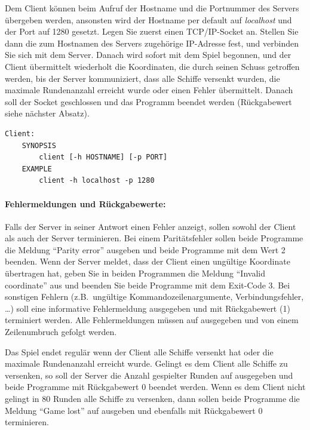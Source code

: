 Dem Client können beim Aufruf der Hostname und die Portnummer des Servers
übergeben werden, ansonsten wird der Hostname per default auf \emph{localhost}
und der Port auf 1280 gesetzt. Legen Sie zuerst einen
TCP/IP-Socket an. Stellen Sie dann die zum Hostnamen des Servers zugehörige
IP-Adresse fest, und verbinden Sie sich mit dem Server. Danach wird sofort mit
dem Spiel begonnen, und der Client übermittelt wiederholt die Koordinaten,
die durch seinen Schuss getroffen werden, bis der Server kommuniziert,
dass alle Schiffe versenkt wurden, die maximale Rundenanzahl erreicht wurde
oder einen Fehler übermittelt.
Danach soll der Socket geschlossen und das
Programm beendet werden (Rückgabewert siehe nächster Absatz).

\vspace{-10pt}
\begin{verbatim}
Client:
    SYNOPSIS
        client [-h HOSTNAME] [-p PORT]
    EXAMPLE
        client -h localhost -p 1280
\end{verbatim}

\paragraph{Fehlermeldungen und Rückgabewerte:}

Falls der Server in seiner Antwort einen Fehler anzeigt, sollen sowohl der Client als auch der Server terminieren.
Bei einem Paritätsfehler sollen beide Programme die Meldung ``Parity error'' ausgeben
und beide Programme mit dem Wert 2 beenden.
Wenn der Server meldet, dass der Client einen ungültige Koordinate übertragen hat,
geben Sie in beiden Programmen die Meldung ``Invalid coordinate'' aus und beenden Sie beide Programme mit dem Exit-Code 3.
Bei sonstigen Fehlern (z.B.\ ungültige Kommandozeilenargumente, Verbindungsfehler, \ldots)
soll eine informative Fehlermeldung ausgegeben und mit Rückgabewert
 (1) terminiert werden. Alle Fehlermeldungen müssen auf
 ausgegeben und von einem Zeilenumbruch gefolgt werden.

Das Spiel endet regulär wenn der Client alle Schiffe versenkt hat oder die maximale Rundenanzahl erreicht wurde.
Gelingt es dem Client alle Schiffe zu versenken, so soll der Server die Anzahl gespielter Runden auf  ausgegeben und beide
Programme mit Rückgabewert 0 beendet werden.
Wenn es dem Client nicht gelingt in 80 Runden alle Schiffe zu versenken, dann sollen beide Programme die Meldung ``Game lost'' auf  ausgeben
und ebenfalls mit Rückgabewert 0 terminieren.

